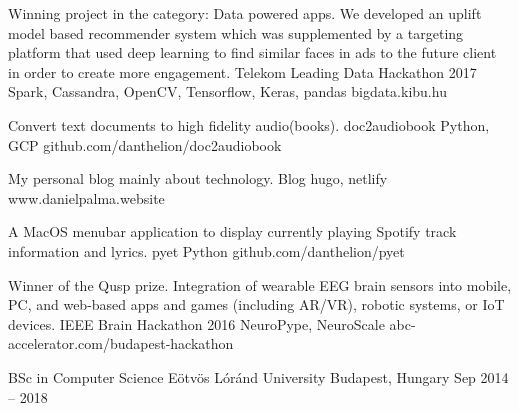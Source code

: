 \documentclass[]{awesome-cv}
\begin{document}
\vspace{-7mm}
\begin{cventries}
	\cventry
	{Winning project in the category: Data powered apps. We developed an uplift model based recommender system which was supplemented by a targeting platform that used deep learning to find similar faces in ads to the future client in order to create more engagement.}
	{Telekom Leading Data Hackathon 2017}
	{Spark, Cassandra, OpenCV, Tensorflow, Keras, pandas}
	{bigdata.kibu.hu}
	{}
	
	\vspace{-5mm}
	\cventry
	{Convert text documents to high fidelity audio(books).}
	{doc2audiobook}
	{Python, GCP}
	{github.com/danthelion/doc2audiobook}
	{}
	
	\vspace{-5mm}
	\cventry
	{My personal blog mainly about technology.}
	{Blog}
	{hugo, netlify}
	{www.danielpalma.website}
	{}
	
	\vspace{-5mm}
	\cventry
	{A MacOS menubar application to display currently playing Spotify track information and lyrics.}
	{pyet}
	{Python}
	{github.com/danthelion/pyet}
	{}
	
	\vspace{-5mm}
	\cventry
	{Winner of the Qusp prize. Integration of wearable EEG brain sensors into mobile, PC, and web-based apps and games (including AR/VR), robotic systems, or IoT devices.}
	{IEEE Brain Hackathon 2016}
	{NeuroPype, NeuroScale}
	{abc-accelerator.com/budapest-hackathon}
	{}
	
	\vspace{-5mm}
\end{cventries}

\begin{cventries}
	\cventry
	{BSc in Computer Science}
	{Eötvös Lóránd University}
	{Budapest, Hungary}
	{Sep 2014 – 2018}
	{}
\end{cventries}

\vspace{-2mm}
\ 
\end{document}
